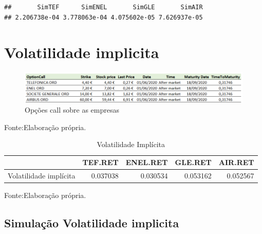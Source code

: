 \documentclass[
  12pt,
  a4paper,
  openany]{book}
\newenvironment{Shaded}{\begin{snugshade}}{\end{snugshade}}
\newcommand{\DecValTok}[1]{\textcolor[rgb]{0.00,0.00,0.81}{#1}}
\newcommand{\NormalTok}[1]{#1}
\newcommand{\OperatorTok}[1]{\textcolor[rgb]{0.81,0.36,0.00}{\textbf{#1}}}
\newcommand{\StringTok}[1]{\textcolor[rgb]{0.31,0.60,0.02}{#1}}
\begin{document}
\begin{verbatim}
##       SimTEF      SimENEL       SimGLE       SimAIR 
## 2.206738e-04 3.778063e-04 4.075602e-05 7.626937e-05
\end{verbatim}

\begin{Shaded}
\end{Shaded}

\normalsize

\hypertarget{volatilidade-implicita}{%
\section{Volatilidade implicita}\label{volatilidade-implicita}}

\begin{figure}

{\centering \includegraphics[width=1\linewidth]{image/opcao} 

}

\caption{Opções call sobre as empresas }\label{fig:opcao}
\end{figure}
\FloatBarrier
\centering

Fonte:Elaboração própria.

\justifying
\bigskip

\begin{table}[!h]

\caption{\label{tab:unnamed-chunk-46}Volatilidade Implícita}
\centering
\begin{tabular}[t]{lrrrr}
\toprule
  & TEF.RET & ENEL.RET & GLE.RET & AIR.RET\\
\midrule
Volatilidade implícita & 0.037038 & 0.030534 & 0.053162 & 0.052567\\
\bottomrule
\end{tabular}
\end{table}
\FloatBarrier
\centering

Fonte:Elaboração própria.

\justifying
\bigskip

\hypertarget{simulauxe7uxe3o-volatilidade-implicita}{%
\subsection{Simulação Volatilidade implicita}\label{simulauxe7uxe3o-volatilidade-implicita}}
\end{document}
